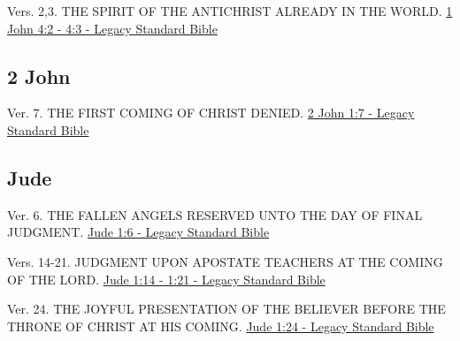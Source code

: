 \documentclass[
  ignorenonframetext,
]{beamer}
\begin{document}
\begin{frame}{4}
\label{section-251}
\begin{block}{Vers. 2,3. THE SPIRIT OF THE ANTICHRIST ALREADY IN THE
WORLD.}
\label{vers.-23.-the-spirit-of-the-antichrist-already-in-the-world.}
\href{https://read.lsbible.org/?q=1jn4\%3A2-3}{1 John 4:2 - 4:3 - Legacy
Standard Bible}
\end{block}
\end{frame}

\subsection{2 John}\label{john-2}

\begin{frame}{1}
\label{section-252}
\begin{block}{Ver. 7. THE FIRST COMING OF CHRIST DENIED.}
\label{ver.-7.-the-first-coming-of-christ-denied.}
\href{https://read.lsbible.org/?q=2jn1\%3A7}{2 John 1:7 - Legacy
Standard Bible}
\end{block}
\end{frame}

\subsection{Jude}\label{jude}

\begin{frame}{1}
\label{section-253}
\begin{block}{Ver. 6. THE FALLEN ANGELS RESERVED UNTO THE DAY OF FINAL
JUDGMENT.}
\label{ver.-6.-the-fallen-angels-reserved-unto-the-day-of-final-judgment.}
\href{https://read.lsbible.org/?q=jude1\%3A6}{Jude 1:6 - Legacy Standard
Bible}
\end{block}

\begin{block}{Vers. 14-21. JUDGMENT UPON APOSTATE TEACHERS AT THE COMING
OF THE LORD.}
\label{vers.-14-21.-judgment-upon-apostate-teachers-at-the-coming-of-the-lord.}
\href{https://read.lsbible.org/?q=jude1\%3A14-21}{Jude 1:14 - 1:21 -
Legacy Standard Bible}
\end{block}

\begin{block}{Ver. 24. THE JOYFUL PRESENTATION OF THE BELIEVER BEFORE
THE THRONE OF CHRIST AT HIS COMING.}
\label{ver.-24.-the-joyful-presentation-of-the-believer-before-the-throne-of-christ-at-his-coming.}
\href{https://read.lsbible.org/?q=jude1\%3A24}{Jude 1:24 - Legacy
Standard Bible}
\end{block}
\end{frame}
\end{document}
